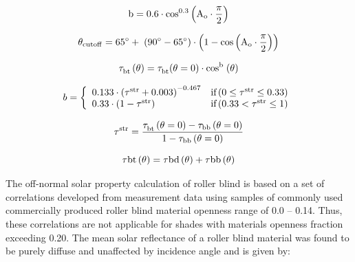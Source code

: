 \begin{equation}
{\rm{b}} = {\rm{0}}{\rm{.6}} \cdot {\rm{co}}{{\rm{s}}^{{\rm{0}}{\rm{.3}}}}\left( {{{\rm{A}}_{\rm{o}}} \cdot \frac{{\rm{\pi }}}{{\rm{2}}}} \right)
\end{equation}

\begin{equation}
{{\rm{\theta }}_{{\rm{cutoff}}}} = {\rm{65}}^\circ  + \;\left( {{\rm{90}}^\circ  - {\rm{65}}^\circ } \right) \cdot \left( {{\rm{1}} - {\rm{cos}}\left( {{{\rm{A}}_{\rm{o}}} \cdot \frac{{\rm{\pi }}}{{\rm{2}}}} \right)} \right)
\end{equation}

\begin{equation}
{\rm{\tau }}_{{\rm{bt}}}^{}\left( {\rm{\theta }} \right) = {\rm{\tau }}_{{\rm{bt}}}^{}{\rm{(\theta }} = {\rm{0)}} \cdot {\rm{co}}{{\rm{s}}^{\rm{b}}}{\kern 1pt} \left( {\rm{\theta }} \right)
\end{equation}

\begin{equation}
b = \left\{ 
    \begin{array}{lc}
      0.133 \cdot \left( \rm{\tau}^{str} + 0.003 \right)^{-0.467} &\text{if} \left( 0 \le \rm{\tau}^{str} \le 0.33 \right) \\
      0.33 \cdot \left( 1 - \rm{\tau}^{str} \right)               &\text{if} \left( 0.33 < \rm{\tau}^{str} \le 1 \right)
    \end{array}
  \right.
\end{equation}

\begin{equation}
{\rm{\tau }}_{}^{{\rm{str}}} = \frac{{{\rm{\tau }}_{{\rm{bt}}}^{}\left( {{\rm{\theta }} = {\rm{0}}} \right) - {{\rm{\tau }}_{{\rm{bb}}}}\left( {{\rm{\theta }} = {\rm{0}}} \right)}}{{{\rm{1}} - {{\rm{\tau }}_{{\rm{bb}}}}\left( {{\rm{\theta }} = {\rm{0}}} \right)}}
\end{equation}

\begin{equation}
{\rm{\tau bt}}\left( {\rm{\theta }} \right) = {\rm{\tau bd}}\left( {\rm{\theta }} \right) + {\rm{\tau bb}}\left( {\rm{\theta }} \right)
\end{equation}

The off-normal solar property calculation of roller blind is based on a set of correlations developed from measurement data using samples of commonly used commercially produced roller blind material openness range of 0.0 -- 0.14. Thus, these correlations are not applicable for shades with materials openness fraction exceeding 0.20. The mean solar reflectance of a roller blind material was found to be purely diffuse and unaffected by incidence angle and is given by:

